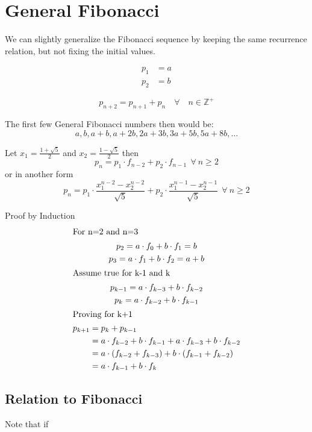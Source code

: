 \documentclass[a4paper]{article}
\begin{document}
\section{General Fibonacci}\label{sec:general-fibonacci}
We can slightly generalize the Fibonacci sequence by keeping the same recurrence relation, but not fixing the initial values.

\begin{align}
p_1 &= a \\
p_2 &= b
\end{align}

\begin{equation}
p_{n+2} = p_{n+1} + p_{n} \quad \forall \quad n \in \mathbb{Z}^+\label{eq:equation4}
\end{equation}

The first few General Fibonacci numbers then would be:
\[
a,b,a+b,a+2b,2a+3b,3a+5b,5a+8b, \ldots
\]

\begin{theorem}
Let
$x_1 = \frac{1 + \sqrt{5}}{2}$ and
$x_2 = \frac{1 - \sqrt{5}}{2}$ then
\[
p_n = p_1 \cdot f_{n-2} + p_2 \cdot f_{n-1}  \ \ \forall \  n \geq 2
\]
or in another form
\[
p_n = p_1 \cdot \frac{x_1^{n-2} - x_2^{n-2}}{\sqrt{5}} + p_2 \cdot \frac{x_1^{n-1} - x_2^{n-1}}{\sqrt{5}}  \ \ \forall \  n \geq 2
\]

Proof by Induction
\begin{gather*}
\shortintertext{For n=2 and n=3}
p_2 = a \cdot f_0 + b \cdot f_1 = b \\
p_3 = a \cdot f_1 + b \cdot f_2 = a + b \\
\shortintertext{Assume true for k-1 and k}
p_{k-1} = a \cdot f_{k-3} + b \cdot f_{k-2}\\
p_k = a \cdot f_{k-2} + b \cdot f_{k-1}\\
\shortintertext{Proving for k+1}
\begin{split}
p_{k+1} &= p_k + p_{k-1}\\
		&= a \cdot f_{k-2} + b \cdot f_{k-1} + a \cdot f_{k-3} + b \cdot f_{k-2}\\
		&= a \cdot (f_{k-2}+f_{k-3}) + b \cdot (f_{k-1}+f_{k-2})\\
		&= a \cdot f_{k-1} + b \cdot f_{k}\\
\end{split}
\end{gather*}
\end{theorem}

\subsection{Relation to Fibonacci}\label{subsec:relation-to-fibonacci}
Note that if
\end{document}
